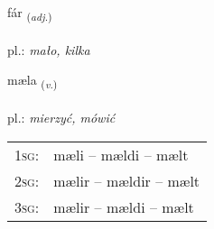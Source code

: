 \documentclass[frontgrid, backgrid]{flacards}\usepackage[]{graphicx}\usepackage[]{xcolor}
\begin{document}
\renewcommand{\blhead}{\vskip5pt {\small\bfseries\footnotesize Lýsingarorð | Adjective }}
\renewcommand{\bcfoot}{\vskip5pt \hspace{2pt}{\small\bfseries\footnotesize 1K}}


{fár \small{\textsubscript{(\textit{adj.})}} \\[1ex] %
\textphonetic{[fauːr]} \\
pl.: \emph{mało, kilka} \\  [2ex]
\renewcommand*{\arraystretch}{0.8}
}

\renewcommand{\flhead}{\vskip5pt \fboxsep=0pt {\small\bfseries\footnotesize Sagnorð | Verb}}
\renewcommand{\fcfoot}{\vskip5pt \fboxsep=0pt \hspace{2pt}{\small\bfseries\footnotesize 1K}}

\renewcommand{\blhead}{\vskip5pt {\small\bfseries\footnotesize Sagnorð | Verb }}
\renewcommand{\bcfoot}{\vskip5pt \hspace{2pt}{\small\bfseries\footnotesize 1K}}


{mæla \small{\textsubscript{(\textit{v.})}} \\[1ex] %
\textphonetic{[maiːla]} \\
pl.: \emph{mierzyć, mówić} \\  [2ex]
\renewcommand*{\arraystretch}{0.8}
\begin{tabular}{p{1cm}l}
\textsc{1sg}: & mæli -- mældi -- mælt \\ 
\textsc{2sg}: & mælir -- mældir -- mælt \\ 
\textsc{3sg}: & mælir -- mældi -- mælt \\ 
\end{tabular}
}
\end{document}
